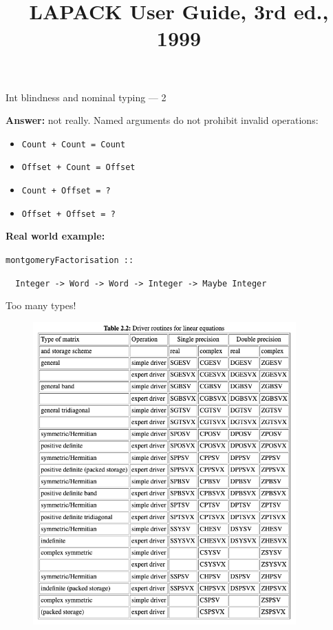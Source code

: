 \documentclass[handout]{beamer}
\begin{document}
\begin{frame}{Int blindness and nominal typing --- 2}

{\bf Answer:} not really. Named arguments do not prohibit invalid operations:

\pause

\begin{itemize}
\item {\tt Count  + Count  = Count }\pause
\item {\tt Offset + Count  = Offset }\pause
\item {\tt Count  + Offset = ? }\pause
\item {\tt Offset + Offset = ?}\pause
\end{itemize}

\bigskip

{\bf Real world example:}

\medskip

{\tt montgomeryFactorisation :: } \par
{\tt  ~ Integer -> Word -> Word -> Integer -> Maybe Integer }

\end{frame}

\title{LAPACK User Guide, 3rd ed., 1999}
\author[]{}

\begin{frame}{Too many types!}
\begin{figure}[H]
\centering
\includegraphics[width=0.9\textwidth]{lapack.png}
\end{figure}
\end{frame}
\end{document}
